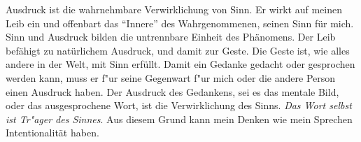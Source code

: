 \documentclass[a4paper, 12pt]{article}
\begin{document}
\begin{onehalfspace}
Ausdruck ist die wahrnehmbare Verwirklichung von Sinn. Er wirkt auf meinen Leib ein und offenbart das "`Innere"' des Wahrgenommenen, seinen Sinn für mich. Sinn und Ausdruck bilden die untrennbare Einheit des Phänomens. Der Leib befähigt zu natürlichem Ausdruck, und damit zur Geste. Die Geste ist, wie alles andere in der Welt, mit Sinn erfüllt. Damit ein Gedanke gedacht oder gesprochen werden kann, muss er f"ur seine Gegenwart f"ur mich oder die andere Person einen Ausdruck haben. Der Ausdruck des Gedankens, sei es das mentale Bild, oder das ausgesprochene Wort, ist die Verwirklichung des Sinns. \emph{Das Wort selbst ist Tr"ager des Sinnes}. Aus diesem Grund kann mein Denken wie mein Sprechen Intentionalität haben.



\end{onehalfspace}
\nocite{*}
%
\printbibliography
\end{document}

